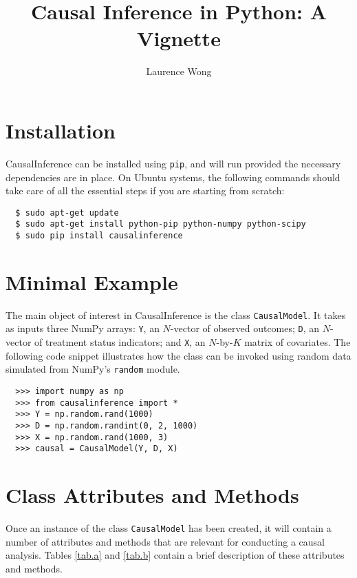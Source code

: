 \documentclass[12pt]{article}
\theoremstyle{definition}
\theoremstyle{definition}
\theoremstyle{definition}
\theoremstyle{remark}
\begin{document}

\title{Causal Inference in Python: A Vignette}
\author{Laurence Wong}
\maketitle

\section*{Installation}

CausalInference can be installed using \texttt{pip}, and will run provided the necessary dependencies are in place. On Ubuntu systems, the following commands should take care of all the essential steps if you are starting from scratch:
\begin{verbatim}
  $ sudo apt-get update
  $ sudo apt-get install python-pip python-numpy python-scipy
  $ sudo pip install causalinference
\end{verbatim}

\section*{Minimal Example}

The main object of interest in CausalInference is the class \texttt{CausalModel}. It takes as inputs three NumPy arrays: \texttt{Y}, an $N$-vector of observed outcomes; \texttt{D}, an $N$-vector of treatment status indicators; and \texttt{X}, an $N$-by-$K$ matrix of covariates. The following code snippet illustrates how the class can be invoked using random data simulated from NumPy's \texttt{random} module.

\begin{verbatim}
  >>> import numpy as np
  >>> from causalinference import *
  >>> Y = np.random.rand(1000)
  >>> D = np.random.randint(0, 2, 1000)
  >>> X = np.random.rand(1000, 3)
  >>> causal = CausalModel(Y, D, X)
\end{verbatim}

\section*{Class Attributes and Methods}

Once an instance of the class \texttt{CausalModel} has been created, it will contain a number of attributes and methods that are relevant for conducting a causal analysis. Tables \ref{tab.a} and \ref{tab.b} contain a brief description of these attributes and methods. \\
\end{document}
